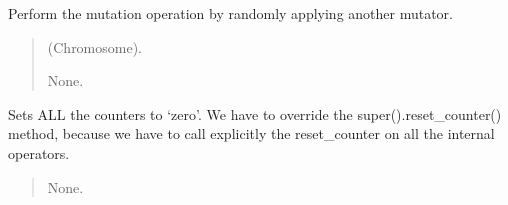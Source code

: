 \documentclass[letterpaper,10pt,english]{sphinxmanual}
\begin{document}
\begin{fulllineitems}
\begin{fulllineitems}
\begin{quote}
\begin{description}
\end{description}\end{quote}

\end{fulllineitems}


\begin{fulllineitems}
\label{\detokenize{pygenalgo.operators.mutation:pygenalgo.operators.mutation.meta_mutator.MetaMutator.mutate}}
\pysigstartsignatures
{}
\pysigstopsignatures
\sphinxAtStartPar
Perform the mutation operation by randomly applying another mutator.
\begin{quote}\begin{description}
\sphinxAtStartPar
{} \textendash{} (Chromosome).

\sphinxAtStartPar
None.

\end{description}\end{quote}

\end{fulllineitems}


\begin{fulllineitems}
\label{\detokenize{pygenalgo.operators.mutation:pygenalgo.operators.mutation.meta_mutator.MetaMutator.reset_counter}}
\pysigstartsignatures
{}
\pysigstopsignatures
\sphinxAtStartPar
Sets ALL the counters to ‘zero’. We have to override the super().reset\_counter()
method, because we have to call explicitly the reset\_counter on all the internal
operators.
\begin{quote}\begin{description}
\sphinxAtStartPar
None.

\end{description}\end{quote}

\end{fulllineitems}


\end{fulllineitems}
\end{document}
